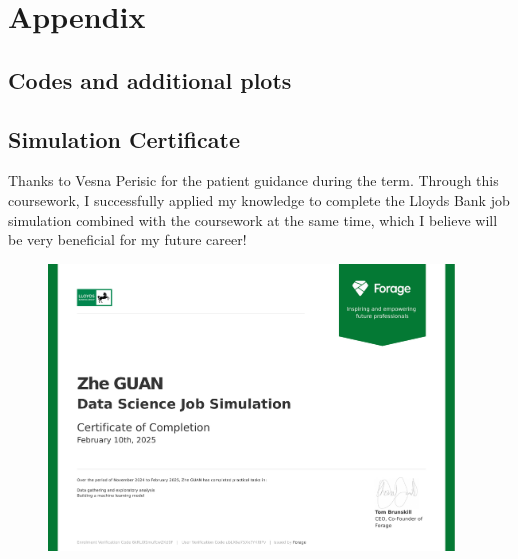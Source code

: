\documentclass[journal=gmj]{CUP-JNL-DTM}%
\theoremstyle{definition}
\numberwithin{equation}{section}
\begin{document}
%

%
\printbibliography


\section{Appendix}

\subsection{Codes and additional plots}





\subsection{Simulation Certificate}
Thanks to Vesna Perisic for the patient guidance during the term. Through this coursework, I successfully applied my knowledge to complete the Lloyds Bank job simulation combined with the coursework at the same time, which I believe will be very beneficial for my future career!

\begin{figure}[h]
    \centering
    \includegraphics[width=0.96\textwidth]{LLoyd_Simulation_Certificate.pdf}
\end{figure}
\end{document}
